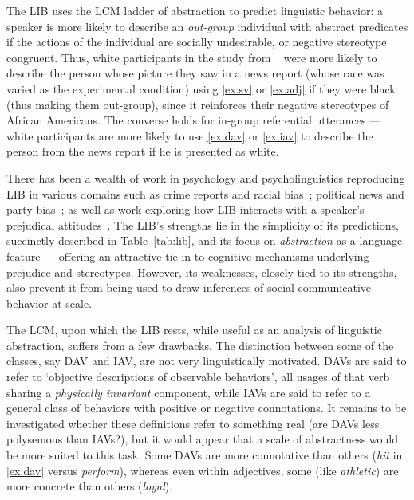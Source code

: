 The LIB uses the LCM ladder of abstraction to predict linguistic behavior: a speaker is more likely to describe an \emph{out-group} individual with abstract predicates if the actions of the individual are socially undesirable, or negative stereotype congruent. Thus, white participants in the study from ~\citet{gorham_news_2006} were more likely to describe the person whose picture they saw in a news report (whose race was varied as the experimental condition) using \ref{ex:sv} or \ref{ex:adj} if they were black (thus making them out-group), since it reinforces their negative stereotypes of African Americans. The converse holds for in-group referential utterances --- white participants are more likely to use \ref{ex:dav} or \ref{ex:iav} to describe the person from the news report if he is presented as white.

There has been a wealth of work in psychology and psycholinguistics reproducing LIB in various domains such as crime reports and racial bias~\citep{gorham_news_2006}; political news and party bias~\citep{anolli_linguistic_2006}; as well as work exploring how LIB interacts with a speaker's prejudical attitudes~\citep{schnake_modern_1998, greenwald_implicit_2006}. The LIB's strengths lie in the simplicity of its predictions, succinctly described in Table~\ref{tab:lib}, and its focus on \emph{abstraction} as a language feature --- offering an attractive tie-in to cognitive mechanisms underlying prejudice and stereotypes. However, its weaknesses, closely tied to its strengths, also prevent it from being used to draw inferences of social communicative behavior at scale.

The LCM, upon which the LIB rests, while useful as an analysis of linguistic abstraction, suffers from a few drawbacks. The distinction between some of the classes, say DAV and IAV, are not very linguistically motivated. DAVs are said to refer to `objective descriptions of observable behaviors', all usages of that verb sharing a \textit{physically invariant} component, while IAVs are said to refer to a general class of behaviors with positive or negative connotations. It remains to be investigated whether these definitions refer to something real (are DAVs less polysemous than IAVs?), but it would appear that a scale of abstractness would be more suited to this task. Some DAVs are more connotative than others (\textit{hit} in \ref{ex:dav} versus \textit{perform}), whereas even within adjectives, some (like \textit{athletic}) are more concrete than others (\textit{loyal}).

